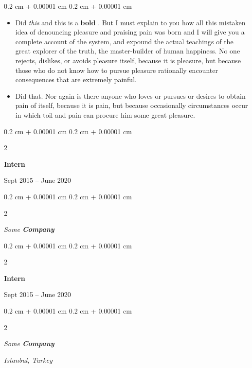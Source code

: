 \documentclass[10pt, letterpaper]{article}
\newenvironment{highlights}{
    \begin{itemize}[
        topsep=0.10 cm,
        parsep=0.10 cm,
        partopsep=0pt,
        itemsep=0pt,
        leftmargin=0.4 cm + 10pt
    ]
}{
    \end{itemize}
} %
\newenvironment{onecolentry}{
    \begin{adjustwidth}{
        0.2 cm + 0.00001 cm
    }{
        0.2 cm + 0.00001 cm
    }
}{
    \end{adjustwidth}
} %
\newenvironment{twocolentry}[2][]{
    \onecolentry
    \def\secondColumn{#2}
    \setcolumnwidth{\fill, 4.5 cm}
    \begin{paracol}{2}
}{
    \switchcolumn \raggedleft \secondColumn
    \end{paracol}
    \endonecolentry
} %
\let\hrefWithoutArrow\href
\renewcommand{\href}[2]{\hrefWithoutArrow{#1}{\ifthenelse{\equal{#2}{}}{ }{#2 }\raisebox{.15ex}{\footnotesize \faExternalLink*}}}
\begin{document}
        \vspace{0.10 cm}
        \begin{onecolentry}
            \begin{highlights}
                \item Did \textit{this} and this is a \textbf{bold} \href{https://example.com}{link}. But I must explain to you how all this mistaken idea of denouncing pleasure and praising pain was born and I will give you a complete account of the system, and expound the actual teachings of the great explorer of the truth, the master-builder of human happiness. No one rejects, dislikes, or avoids pleasure itself, because it is pleasure, but because those who do not know how to pursue pleasure rationally encounter consequences that are extremely painful.
                \item Did that. Nor again is there anyone who loves or pursues or desires to obtain pain of itself, because it is pain, but because occasionally circumstances occur in which toil and pain can procure him some great pleasure.
            \end{highlights}
        \end{onecolentry}


        \vspace{0.2 cm}

                \begin{twocolentry}{
                    Sept 2015 – June 2020
                }
                \textbf{Intern}
                \end{twocolentry}
            \begin{twocolentry}{
            }
            \textit{Some \textbf{Company}}
            \end{twocolentry}



        \vspace{0.2 cm}

                \begin{twocolentry}{
                    Sept 2015 – June 2020
                }
                \textbf{Intern}
                \end{twocolentry}
            \begin{twocolentry}{
        \textit{Istanbul, Turkey}    }
            \textit{Some \textbf{Company}}
            \end{twocolentry}



        \vspace{0.2 cm}
\end{document}
